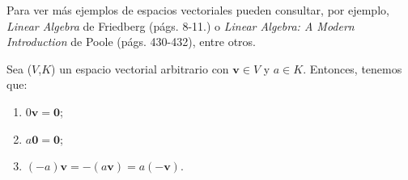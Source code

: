 \documentclass[apuntes]{subfiles}
\begin{document}
Para ver más ejemplos de espacios vectoriales pueden consultar, por ejemplo, \emph{Linear Algebra} de Friedberg (págs. 8-11.) o \emph{Linear Algebra: A Modern Introduction} de Poole (págs. 430-432), entre otros. \\

\begin{Teo}\label{teo:1.8}
    Sea ($V$,$K$) un espacio vectorial arbitrario con $\mathbf{v}\in V$ y $a\in K$. Entonces, tenemos que:
    \begin{enumerate}[label=(\alph*)]

        \item $0\mathbf{v}=\mathbf{0}$;

        \item $a\mathbf{0}=\mathbf{0}$;

        \item $(-a)\mathbf{v}=-(a\mathbf{v})=a(-\mathbf{v})$.
    \end{enumerate}
\end{Teo}
\end{document}
